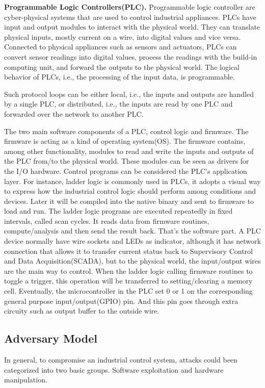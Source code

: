\textbf{Programmable Logic Controllers(PLC).} Programmable logic controller are cyber-physical systems that are used to control industrial appliances. PLCs have input and output modules to interact with the physical world. They can translate physical inputs, mostly current on a wire, into digital values and vice versa. Connected to physical appliances such as sensors and actuators, PLCs can convert sensor readings into digital values, process the readings with the build-in computing unit, and forward the outputs to the physical world. The logical behavior of PLCs, i.e., the processing of the input data, is programmable.

Such protocol loops can be either local, i.e., the inputs and outputs are handled by a single PLC, or distributed, i.e., the inputs are read by one PLC and forwarded over the network to another PLC.

The two main software components of a PLC, control logic and firmware. The firmware is acting as a kind of operating system(OS). The firmware contains, among other functionality, modules to read and write the inputs and outputs of the PLC from/to the physical world. These modules can be seen as drivers for the I/O hardware. Control programs can be considered the PLC's application layer. For instance, ladder logic is commonly used in PLCs, it adopts a visual way to express how the industrial control logic should perform among conditions and devices. Later it will be compiled into the native binary and sent to firmware to load and run. The ladder logic programs are executed repeatedly in fixed intervals, called scan cycles. It reads data from firmware routines, compute/analysis and then send the result back. That's the software part. A PLC device normally have wire sockets and LEDs as indicator, although it has network connection that allows it to transfer current status back to Supervisory Control and Data Acquisition(SCADA), but to the physical world, the input/output wires are the main way to control. When the ladder logic calling firmware routines to toggle a trigger, this operation will be transferred to setting/clearing a memory cell. Eventually, the microcontroller in the PLC set 0 or 1 on the corresponding general purpose input/output(GPIO) pin. And this pin goes through extra circuity such as output buffer to the outside wire.   






\subsection{Adversary Model}
In general, to compromise an industrial control system, attacks could been categorized into two basic groups. Software exploitation and hardware manipulation.

